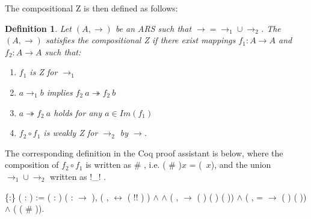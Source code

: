 \documentclass[a4paper]{article}
\newcommand{\tto}{\twoheadrightarrow}
\newtheorem{definition}{Definition}[section]
\begin{document}
The compositional Z is then defined as follows:

\begin{definition}\cite{Nakazawa-Fujita2016}
  Let $(A,\to)$ be an ARS such that $\to = \to_1 \cup \to_2$. The
  $(A,\to)$ satisfies the compositional Z if there exist mappings
  $f_1:A \to A$ and $f_2:A \to A$ such that:
  \begin{enumerate}
  \item $f_1$ is Z for $\to_1$ 
  \item $a \to_1 b$ implies $f_2\ a \tto f_2\ b$ 
  \item $a \tto f_2\ a$ holds for any $a \in Im(f_1)$ 
  \item $f_2\circ f_1$ is weakly Z for $\to_2$ by $\to$.
  \end{enumerate}
\end{definition}

The corresponding definition in the Coq proof assistant is below,
where the composition of $f_2\circ f_1$ is written as 
\# , i.e. ( \# )$x$ =
(\ $x$), and the union $\to_1 \cup \to_2$
written as  !\_! .

\begin{coqdoccode}
  \coqdocemptyline \coqdocnoindent {}
   \{:\} (
  : ) := \coqdoctac{\ensuremath{\exists}}
  ( :  )
  ( : 
  \ensuremath{\rightarrow} ),
  (\coqdockw{\ensuremath{\forall}}  ,
    
  \ensuremath{\leftrightarrow} ( !\coqdocvar{\_}!
  )  ) \ensuremath{\land}
    
  \ensuremath{\land} (\coqdockw{\ensuremath{\forall}} 
  ,   
  \ensuremath{\rightarrow} ( )
  ( ) ( ))
  \ensuremath{\land} (\coqdockw{\ensuremath{\forall}} 
  ,  =  
  \ensuremath{\rightarrow} ( )
   ( )) \ensuremath{\land}
  (  
  ( \# )).\coqdoceol \coqdocemptyline
  \coqdocemptyline
\end{coqdoccode}
\end{document}
